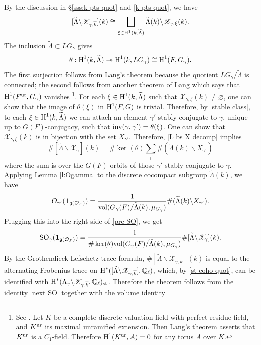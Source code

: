 \documentclass[]{pcmi}
\theoremstyle{plain}
\theoremstyle{definition}
\def\QQ{\mathbb{Q}}
\def\calO{\mathcal{O}}
\newcommand{\sX}{\ensuremath{\mathscr{X}}\xspace}
\newcommand{\sX}{\ensuremath{\mathcal{X}}\xspace}
\newcommand\frg{\mathfrak{g}}
\newcommand\inv{\textup{inv}}
\newcommand\st{\textup{st}}
\newcommand{\vol}{\textup{vol}}
\newcommand\SO{\textup{SO}}
\newcommand{\surj}{\twoheadrightarrow}
\renewcommand{\L}{\Lambda}
\newcommand{\one}{\mathbf{1}}
\newcommand{\Ql}{\QQ_{\ell}}
\newcommand{\wt}{\widetilde}
\newcommand{\bs}{\backslash}
\newcommand{\cohog}[2]{\textup{H}^{#1}({#2})}     %
\newcommand{\kbar}{\overline{k}}
\newcommand{\ur}{\textup{ur}}
\begin{document}
By the discussion in \S\ref{sss:k pts quot} and \eqref{k pts quot}, we have
\begin{equation}\label{L bs X decomp}
[\wt\L\bs\sX_{\gamma,\kbar}](k)\cong\bigsqcup_{\xi\in\cohog{1}{k,\wt\L}} \wt\L(k)\bs\sX_{\gamma,\xi}(k).
\end{equation}
The inclusion $\wt\L\subset LG_{\gamma}$ gives
\begin{equation*}
\theta: \cohog{1}{k,\wt\L}\surj\cohog{1}{k,LG_{\gamma}}\cong\cohog{1}{F, G_{\gamma}}.
\end{equation*}
The first surjection follows from Lang's theorem because the quotient $LG_{\gamma}/\wt\L$ is connected; the second follows from another theorem of Lang which says that $\cohog{1}{F^{\ur}, G_{\gamma}}$ vanishes
\footnote{See \cite[Ch.X, \S7, p.170, Application and Example (b)]{Serre}. Let $K$ be a complete discrete valuation field with perfect residue field, and $K^{\ur}$ its maximal unramified extension. Then Lang's theorem asserts that $K^{\ur}$ is a $C_{1}$-field. Therefore $\cohog{1}{K^{\ur}, A}=0$ for any torus $A$ over $K$.}. For each $\xi\in\cohog{1}{k,\wt\L}$ such that $\sX_{\gamma,\xi}(k)\neq\varnothing$, one can show that the image of $\theta(\xi)$ in $\cohog{1}{F,G}$ is trivial. Therefore, by \eqref{stable class}, to each $\xi\in\cohog{1}{k,\wt\L}$ we can attach an element $\gamma'$ stably conjugate to $\gamma$, unique up to $G(F)$-conjugacy, such that $\inv(\gamma,\gamma')=\theta(\xi)$. One can show that $\sX_{\gamma,\xi}(k)$ is in bijection with the set $X_{\gamma'}$. Therefore,  \eqref{L bs X decomp} implies
\begin{equation}\label{pre SO}
\#[\wt\L\bs\sX_{\gamma}](k)=\#\ker(\theta)\sum_{\gamma'}\#(\wt\L(k)\bs X_{\gamma'})
\end{equation}
where the sum is over the $G(F)$-orbits of those $\gamma'$ stably conjugate to $\gamma$. Applying Lemma \ref{l:Ogamma} to the discrete cocompact subgroup $\wt\L(k)$, we have
\begin{equation*}
O_{\gamma'}(\one_{\frg(\calO_{F})})=\frac{1}{\vol(G_{\gamma}(F)/\wt\L(k),\mu_{G_{\gamma}})}\#(\wt\L(k)\bs X_{\gamma'}).
\end{equation*}
Plugging this into the right side of \eqref{pre SO}, we get
\begin{equation}\label{next SO}
\SO_{\gamma}(\one_{\frg(\calO_{F})})=\frac{1}{\#\ker(\theta)\vol(G_{\gamma}(F)/\wt\L(k),\mu_{G_{\gamma}})}\#[\wt\L\bs\sX_{\gamma}](k).
\end{equation} 
By the Grothendieck-Lefschetz trace formula,   $\#[\wt\L\bs\sX_{\gamma,\kbar}](k)$ is equal to the alternating Frobenius trace on $\cohog{*}{[\wt\L\bs\sX_{\gamma,\kbar}],\Ql}$, which, by \eqref{st coho quot}, can be identified with $\cohog{*}{\L_{\gamma}\bs\sX_{\gamma,\kbar},\Ql}_{\st}$. Therefore the theorem follows from the identity \eqref{next SO} together with the volume identity
\end{document}
